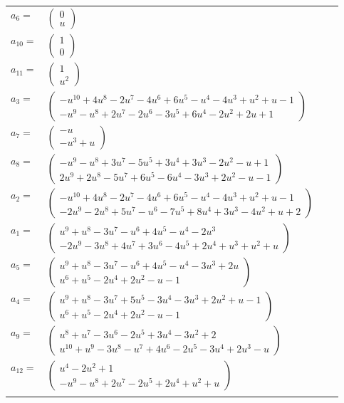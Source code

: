 \documentclass[1p]{elsarticle_modified}
\theoremstyle{definition}
\begin{document}
\begin{tabular}{m{7pt} m{180pt} m{7pt} m{180pt} }
\flushright $a_{6}=$&$\begin{pmatrix}0\\u\end{pmatrix}$ \\
\flushright $a_{10}=$&$\begin{pmatrix}1\\0\end{pmatrix}$ \\
\flushright $a_{11}=$&$\begin{pmatrix}1\\u^2\end{pmatrix}$ \\
\flushright $a_{3}=$&$\begin{pmatrix}- u^{10}+4 u^8-2 u^7-4 u^6+6 u^5- u^4-4 u^3+u^2+u-1\\- u^9- u^8+2 u^7-2 u^6-3 u^5+6 u^4-2 u^2+2 u+1\end{pmatrix}$ \\
\flushright $a_{7}=$&$\begin{pmatrix}- u\\- u^3+u\end{pmatrix}$ \\
\flushright $a_{8}=$&$\begin{pmatrix}- u^9- u^8+3 u^7-5 u^5+3 u^4+3 u^3-2 u^2- u+1\\2 u^9+2 u^8-5 u^7+6 u^5-6 u^4-3 u^3+2 u^2- u-1\end{pmatrix}$ \\
\flushright $a_{2}=$&$\begin{pmatrix}- u^{10}+4 u^8-2 u^7-4 u^6+6 u^5- u^4-4 u^3+u^2+u-1\\-2 u^9-2 u^8+5 u^7- u^6-7 u^5+8 u^4+3 u^3-4 u^2+u+2\end{pmatrix}$ \\
\flushright $a_{1}=$&$\begin{pmatrix}u^9+u^8-3 u^7- u^6+4 u^5- u^4-2 u^3\\-2 u^9-3 u^8+4 u^7+3 u^6-4 u^5+2 u^4+u^3+u^2+u\end{pmatrix}$ \\
\flushright $a_{5}=$&$\begin{pmatrix}u^9+u^8-3 u^7- u^6+4 u^5- u^4-3 u^3+2 u\\u^6+u^5-2 u^4+2 u^2- u-1\end{pmatrix}$ \\
\flushright $a_{4}=$&$\begin{pmatrix}u^9+u^8-3 u^7+5 u^5-3 u^4-3 u^3+2 u^2+u-1\\u^6+u^5-2 u^4+2 u^2- u-1\end{pmatrix}$ \\
\flushright $a_{9}=$&$\begin{pmatrix}u^8+u^7-3 u^6-2 u^5+3 u^4-3 u^2+2\\u^{10}+u^9-3 u^8- u^7+4 u^6-2 u^5-3 u^4+2 u^3- u\end{pmatrix}$ \\
\flushright $a_{12}=$&$\begin{pmatrix}u^4-2 u^2+1\\- u^9- u^8+2 u^7-2 u^5+2 u^4+u^2+u\end{pmatrix}$\\&\end{tabular}
\end{document}
